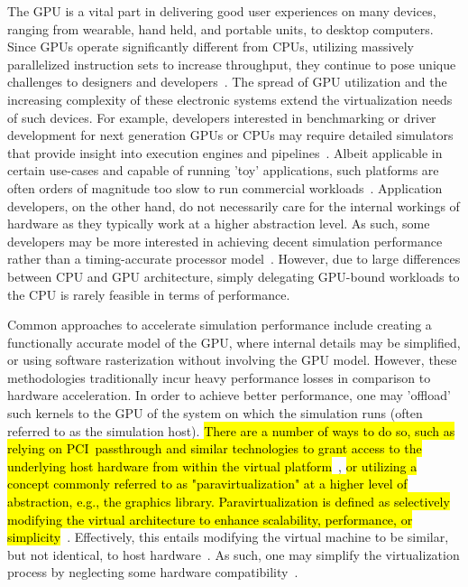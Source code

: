 The GPU is a vital part in delivering good user experiences on many devices, ranging from wearable, hand held, and portable units, to desktop computers.
Since GPUs operate significantly different from CPUs, utilizing massively parallelized instruction sets to increase throughput, they continue to pose unique challenges to designers and developers~.
The spread of GPU utilization and the increasing complexity of these electronic systems extend the virtualization needs of such devices.
For example, developers interested in benchmarking or driver development for next generation GPUs or CPUs may require detailed simulators that provide insight into execution engines and pipelines~.
Albeit applicable in certain use-cases and capable of running 'toy' applications, such platforms are often orders of magnitude too slow to run commercial workloads~.
Application developers, on the other hand, do not necessarily care for the internal workings of hardware as they typically work at a higher abstraction level.
As such, some developers may be more interested in achieving decent simulation performance rather than a timing-accurate processor model~.
However, due to large differences between CPU and GPU architecture, simply delegating GPU-bound workloads to the CPU is rarely feasible in terms of performance.

Common approaches to accelerate simulation performance include creating a functionally accurate model of the GPU, where internal details may be simplified, or using software rasterization without involving the GPU model.
However, these methodologies traditionally incur heavy performance losses in comparison to hardware acceleration.
In order to achieve better performance, one may 'offload' such kernels to the GPU of the system on which the simulation runs (often referred to as the simulation host).
\hl{There are a number of ways to do so, such as relying on PCI~passthrough and similar technologies to grant access to the underlying host hardware from within the virtual platform}~, \hl{or utilizing a concept commonly referred to as "paravirtualization" at a higher level of abstraction, e.g., the graphics library.
Paravirtualization is defined as selectively modifying the virtual architecture to enhance scalability, performance, or simplicity}~.
Effectively, this entails modifying the virtual machine to be similar, but not identical, to host hardware~.
As such, one may simplify the virtualization process by neglecting some hardware compatibility~.

